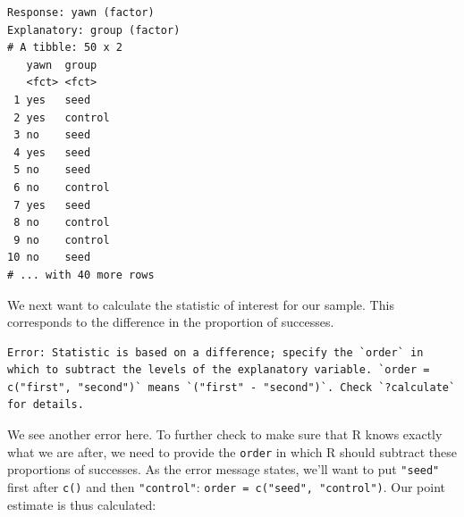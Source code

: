 \documentclass[12pt, krantz2,]{krantz}
\makeatletter
\newenvironment{Shaded}{\begin{snugshade}}{\end{snugshade}}
\newcommand{\DataTypeTok}[1]{\textcolor[rgb]{0.27,0.27,0.27}{#1}}
\newcommand{\KeywordTok}[1]{\textcolor[rgb]{0.27,0.27,0.27}{\textbf{#1}}}
\newcommand{\NormalTok}[1]{#1}
\newcommand{\OperatorTok}[1]{\textcolor[rgb]{0.43,0.43,0.43}{\textbf{#1}}}
\newcommand{\StringTok}[1]{\textcolor[rgb]{0.5,0.5,0.5}{#1}}
\newenvironment{kframe}{%
\medskip{}
\setlength{\fboxsep}{.8em}
 \def\at@end@of@kframe{}%
 \ifinner\ifhmode%
  \def\at@end@of@kframe{\end{minipage}}%
  \begin{minipage}{\columnwidth}%
 \fi\fi%
 \def\FrameCommand##1{\hskip\@totalleftmargin \hskip-\fboxsep
 \colorbox{shadecolor}{##1}\hskip-\fboxsep
     \hskip-\linewidth \hskip-\@totalleftmargin \hskip\columnwidth}%
 \MakeFramed {\advance\hsize-\width
   \@totalleftmargin\z@ \linewidth\hsize
   \@setminipage}}%
 {\par\unskip\endMakeFramed%
 \at@end@of@kframe}
\renewenvironment{Shaded}{\begin{kframe}}{\end{kframe}}
\makeatother
\begin{document}
\begin{verbatim}
Response: yawn (factor)
Explanatory: group (factor)
# A tibble: 50 x 2
   yawn  group  
   <fct> <fct>  
 1 yes   seed   
 2 yes   control
 3 no    seed   
 4 yes   seed   
 5 no    seed   
 6 no    control
 7 yes   seed   
 8 no    control
 9 no    control
10 no    seed   
# ... with 40 more rows
\end{verbatim}

We next want to calculate the statistic of interest for our sample. This corresponds to the difference in the proportion of successes.

\begin{Shaded}
\end{Shaded}

\begin{verbatim}
Error: Statistic is based on a difference; specify the `order` in which to subtract the levels of the explanatory variable. `order = c("first", "second")` means `("first" - "second")`. Check `?calculate` for details.
\end{verbatim}

We see another error here. To further check to make sure that R knows exactly what we are after, we need to provide the \texttt{order} in which R should subtract these proportions of successes. As the error message states, we'll want to put \texttt{"seed"} first after \texttt{c()} and then \texttt{"control"}: \texttt{order\ =\ c("seed",\ "control")}. Our point estimate is thus calculated:

\begin{Shaded}
\end{Shaded}
\end{document}
